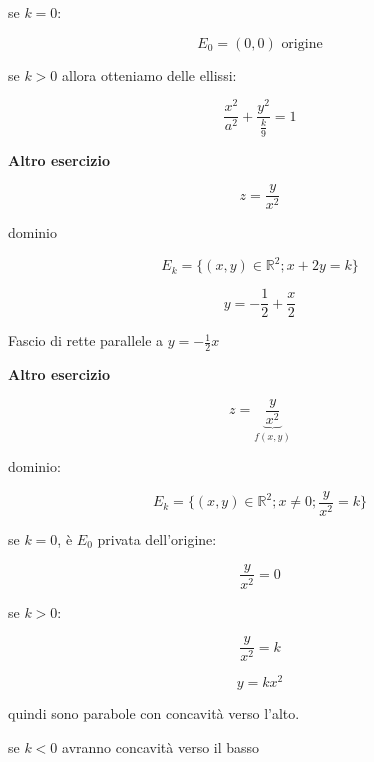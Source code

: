 \documentclass[11pt]{article}
\begin{document}
se $k=0$:

\[
    E_0=(0,0)\text{ origine}
\]

se $k>0$ allora otteniamo delle ellissi:

\[
    \frac{x^{2}}{a^{2}}+ \frac{y^{2}}{ \frac{k}{9}} = 1
\]

\textbf{Altro esercizio} 

\[
    z= \frac{y}{x^{2}}
\]

dominio

\[
    E_k = \{(x,y) \in \mathbb{R}^{2};x+2y=k\}
\]

\[
    y=-\frac{1}{2} + \frac{x}{2}
\]


Fascio di rette parallele a $y = -\frac{1}{2}x$


\textbf{Altro esercizio} 

\[
    z= \underbrace{\frac{y}{x^{2}}}_{f(x,y)}
\]

dominio: 

\[
    E_k = \{(x,y) \in \mathbb{R}^{2}; x \neq  0; \frac{y}{x^{2}}=k\}
\]

se $k=0$, è $E_0$ privata dell'origine:

\[
    \frac{y}{x^{2}}=0
\]

se $k>0$:

\[
    \frac{y}{x^{2}} = k
\]

\[
    y = kx^{2}
\]

quindi sono parabole con concavità verso l'alto.



se $k<0$ avranno concavità verso il basso


\newpage
\end{document}
